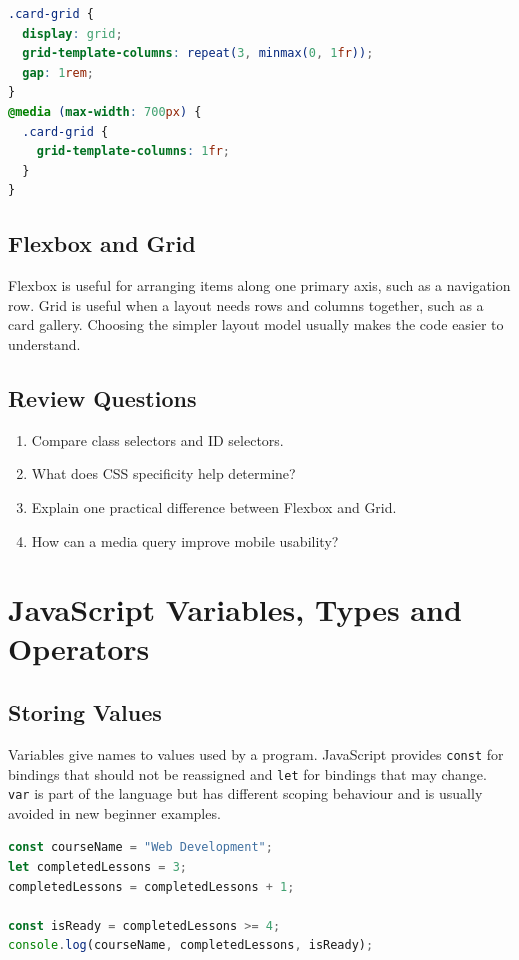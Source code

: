 \documentclass[11pt,openany,oneside]{book}
\begin{document}
\begin{lstlisting}[style=webcode,language=CSS]
.card-grid {
  display: grid;
  grid-template-columns: repeat(3, minmax(0, 1fr));
  gap: 1rem;
}
@media (max-width: 700px) {
  .card-grid {
    grid-template-columns: 1fr;
  }
}
\end{lstlisting}

\section{Flexbox and Grid}
Flexbox is useful for arranging items along one primary axis, such as a navigation row. Grid is useful when a layout needs rows and columns together, such as a card gallery. Choosing the simpler layout model usually makes the code easier to understand.

\section*{Review Questions}
\begin{enumerate}
\item Compare class selectors and ID selectors.
\item What does CSS specificity help determine?
\item Explain one practical difference between Flexbox and Grid.
\item How can a media query improve mobile usability?
\end{enumerate}

\chapter{JavaScript Variables, Types and Operators}
\section{Storing Values}
Variables give names to values used by a program. JavaScript provides \texttt{const} for bindings that should not be reassigned and \texttt{let} for bindings that may change. \texttt{var} is part of the language but has different scoping behaviour and is usually avoided in new beginner examples.

\begin{lstlisting}[style=webcode,language=JavaScript]
const courseName = "Web Development";
let completedLessons = 3;
completedLessons = completedLessons + 1;

const isReady = completedLessons >= 4;
console.log(courseName, completedLessons, isReady);
\end{lstlisting}
\end{document}
